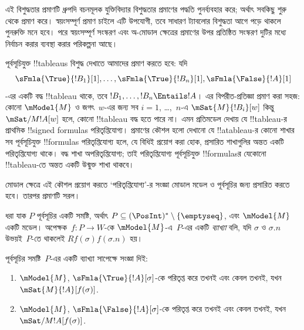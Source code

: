\documentclass[../../../include/open-logic-section]{subfiles}
\begin{document}


\begin{editorial}
  এই বিশুদ্ধতার প্রমাণটি ধ্রুপদি বচনমূলক যুক্তিবিদ্যার বিশুদ্ধতার
  প্রমাণের পদ্ধতি পুনর্ব্যবহার করে; অর্থাৎ সবকিছু শুরু থেকে প্রমাণ
  করে। স্বয়ংসম্পূর্ণ প্রমাণ চাইলে এটি উপযোগী, তবে সাধারণ ট্যাবলোর
  বিশুদ্ধতা আগে পড়ে থাকলে পুনরুক্তি মনে হবে। পরে স্বয়ংসম্পূর্ণ
  সংস্করণ এবং অ-মোডাল ক্ষেত্রের প্রমাণের উপর প্রতিষ্ঠিত সংস্করণ
  দুটির মধ্যে নির্বাচন করার ব্যবস্থা করার পরিকল্পনা আছে।
\end{editorial}

\begin{explain}
  পূর্বসূচিযুক্ত !!{tableau}s বিশুদ্ধ দেখাতে আমাদের প্রমাণ করতে হবে:
  যদি
  \[
  \sFmla{\True}{!B_1}[1], \dots, \sFmla{\True}{!B_n}[1], \sFmla{\False}{!A}[1]
  \]
  -এর একটি বদ্ধ !!{tableau} থাকে, তবে $!B_1, \dots, !B_n \Entails !A$।
  এর বিপরীত-প্রতিজ্ঞা প্রমাণ করা সহজ: কোনো $\mModel{M}$ ও জগৎ~$w$-এর জন্য
  সব $i=1$, \dots,~$n$-এ $\mSat{M}{!B_i}[w]$ কিন্তু
  $\mSat/{M}{!A}[w]$ হলে, কোনো !!{tableau} বদ্ধ হতে পারে না।
  এমন প্রতিমডেল দেখায় যে !!{tableau}-র প্রাথমিক !!{signed formula}s
  পরিতৃপ্তিযোগ্য। প্রমাণের কৌশল হলো দেখানো যে !!a{tableau}-র কোনো শাখার
  সব পূর্বসূচিযুক্ত !!{formula}s পরিতৃপ্তিযোগ্য হলে, যে বিধিই প্রয়োগ
  করা হোক, প্রসারিত শাখাগুলির অন্তত একটি পরিতৃপ্তিযোগ্য থাকে।
  বদ্ধ শাখা অপরিতৃপ্তিযোগ্য; তাই পরিতৃপ্তিযোগ্য পূর্বসূচিযুক্ত
  !!{formula}sর যেকোনো !!{tableau}-তে অন্তত একটি উন্মুক্ত শাখা থাকবে।

  মোডাল ক্ষেত্রে এই কৌশল প্রয়োগ করতে ‘পরিতৃপ্তিযোগ্য’-র সংজ্ঞা
  মোডাল মডেল ও পূর্বসূচির জন্য প্রসারিত করতে হবে। তারপর প্রমাণটি
  সরল।
\end{explain}

\begin{defn}
  ধরা যাক $P$ পূর্বসূচির একটি সমষ্টি, অর্থাৎ $P \subseteq (\PosInt)^*
  \setminus \{\emptyseq\}$, এবং $\mModel{M}$ একটি মডেল।
  অপেক্ষক~$f\colon P \to W$-কে $\mModel{M}$-এ~$P$-এর একটি
  \emph{ব্যাখ্যা} বলি, যদি $\sigma$ ও $\sigma.n$ উভয়ই~$P$-তে
  থাকলেই $Rf(\sigma)f(\sigma.n)$ হয়।

  পূর্বসূচির সমষ্টি~$P$-এর একটি ব্যাখ্যা সাপেক্ষে সংজ্ঞা দিই:
  \begin{enumerate}
  \item $\mModel{M}$, $\sFmla{\True}{!A}[\sigma]$-কে পরিতৃপ্ত করে
    তখনই এবং কেবল তখনই, যখন
    $\mSat{M}{!A}[f(\sigma)]$.
  \item $\mModel{M}$, $\sFmla{\False}{!A}[\sigma]$-কে পরিতৃপ্ত করে
    তখনই এবং কেবল তখনই, যখন
    $\mSat/{M}{!A}[f(\sigma)]$.
  \end{enumerate}
\end{defn}
\end{document}
